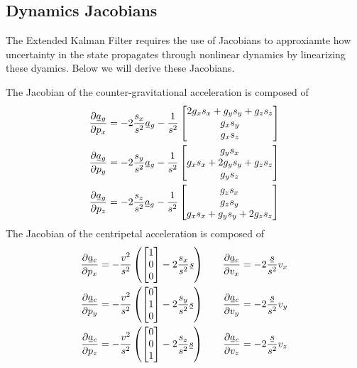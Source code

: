 \documentclass[11pt, letterpaper, twocolumn]{article}
\newcommand{\ul}[1] %
    {{}\mkern1mu\underline{\mkern-1mu#1\mkern-1mu}\mkern1mu}
\begin{document}
\subsection*{Dynamics Jacobians}
The Extended Kalman Filter requires the use of Jacobians to approxiamte how 
uncertainty in the state propagates through nonlinear dynamics by linearizing 
these dyamics. Below we will derive these Jacobians.

The Jacobian of the counter-gravitational acceleration is composed of
\[\begin{aligned}
    \frac{\partial\ul{a}_g}{\partial p_x} &= -2\frac{s_x}{s^2}\ul{a}_g-\frac{1}{s^2}
    \begin{bmatrix}
        2g_xs_x+g_ys_y+g_zs_z \\
        g_xs_y \\
        g_xs_z
    \end{bmatrix} \\
    \frac{\partial\ul{a}_g}{\partial p_y} &= -2\frac{s_y}{s^2}\ul{a}_g-\frac{1}{s^2}
    \begin{bmatrix}
        g_ys_x \\
        g_xs_x+2g_ys_y+g_zs_z \\
        g_ys_z
    \end{bmatrix} \\
    \frac{\partial\ul{a}_g}{\partial p_z} &= -2\frac{s_z}{s^2}\ul{a}_g-\frac{1}{s^2}
    \begin{bmatrix}
        g_zs_x \\
        g_zs_y \\
        g_xs_x+g_ys_y+2g_zs_z
    \end{bmatrix}
\end{aligned}
\]
The Jacobian of the centripetal acceleration is composed of
\[\begin{aligned}
    \frac{\partial\ul{a}_c}{\partial p_x} &= -\frac{v^2}{s^2}\left(
        \begin{bmatrix}
            1 \\
            0 \\
            0
        \end{bmatrix}-2\frac{s_x}{s^2}\ul{s}
    \right) &\quad
    \frac{\partial\ul{a}_c}{\partial v_x} &= -2\frac{\ul{s}}{s^2}v_x \\
    \frac{\partial\ul{a}_c}{\partial p_y} &= -\frac{v^2}{s^2}\left(
        \begin{bmatrix}
            0 \\
            1 \\
            0
        \end{bmatrix}-2\frac{s_y}{s^2}\ul{s}
    \right) &\quad
    \frac{\partial\ul{a}_c}{\partial v_y} &= -2\frac{\ul{s}}{s^2}v_y \\
    \frac{\partial\ul{a}_c}{\partial p_z} &= -\frac{v^2}{s^2}\left(
        \begin{bmatrix}
            0 \\
            0 \\
            1
        \end{bmatrix}-2\frac{s_z}{s^2}\ul{s}
    \right) &\quad
    \frac{\partial\ul{a}_c}{\partial v_z} &= -2\frac{\ul{s}}{s^2}v_z
    \end{aligned}
\]
\end{document}
